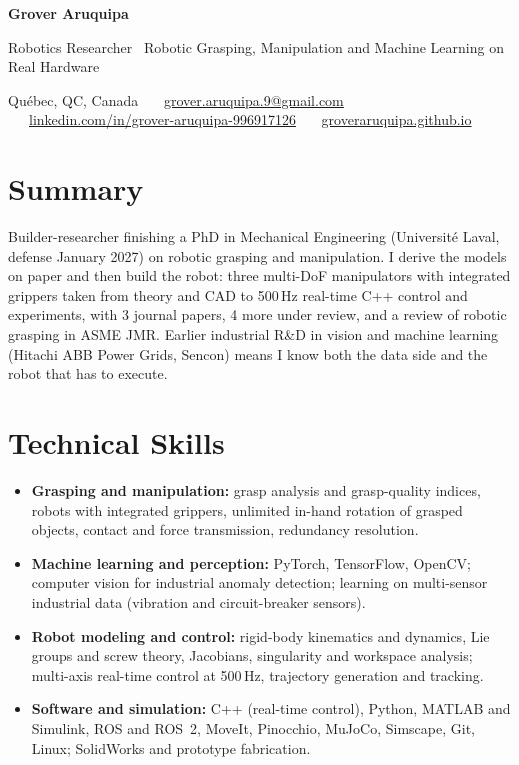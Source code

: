 \documentclass[10pt,letterpaper]{article}
\begin{document}
{\LARGE\bfseries Grover Aruquipa}\par\vspace{2pt}
{\large Robotics Researcher \textbar\ Robotic Grasping, Manipulation and Machine Learning on Real Hardware}\par\vspace{3pt}
{\small Qu\'ebec, QC, Canada \ \textbullet\ \
\href{mailto:grover.aruquipa.9@gmail.com}{grover.aruquipa.9@gmail.com} \ \textbullet\ \
\href{https://www.linkedin.com/in/grover-aruquipa-996917126}{linkedin.com/in/grover-aruquipa-996917126} \ \textbullet\ \
\href{https://groveraruquipa.github.io}{groveraruquipa.github.io}}\par

\section{Summary}
Builder-researcher finishing a PhD in Mechanical Engineering (Universit\'e Laval, defense January 2027) on robotic
grasping and manipulation. I derive the models on paper and then build the robot: three multi-DoF manipulators with
integrated grippers taken from theory and CAD to 500\,Hz real-time C++ control and experiments, with 3 journal papers,
4 more under review, and a review of robotic grasping in ASME JMR. Earlier industrial R\&D in vision and machine
learning (Hitachi ABB Power Grids, Sencon) means I know both the data side and the robot that has to execute.

\section{Technical Skills}
\begin{itemize}
\item \textbf{Grasping and manipulation:} grasp analysis and grasp-quality indices, robots with integrated grippers,
unlimited in-hand rotation of grasped objects, contact and force transmission, redundancy resolution.
\item \textbf{Machine learning and perception:} PyTorch, TensorFlow, OpenCV; computer vision for industrial anomaly
detection; learning on multi-sensor industrial data (vibration and circuit-breaker sensors).
\item \textbf{Robot modeling and control:} rigid-body kinematics and dynamics, Lie groups and screw theory, Jacobians,
singularity and workspace analysis; multi-axis real-time control at 500\,Hz, trajectory generation and tracking.
\item \textbf{Software and simulation:} C++ (real-time control), Python, MATLAB and Simulink, ROS and ROS~2, MoveIt,
Pinocchio, MuJoCo, Simscape, Git, Linux; SolidWorks and prototype fabrication.
\end{itemize}
\end{document}
